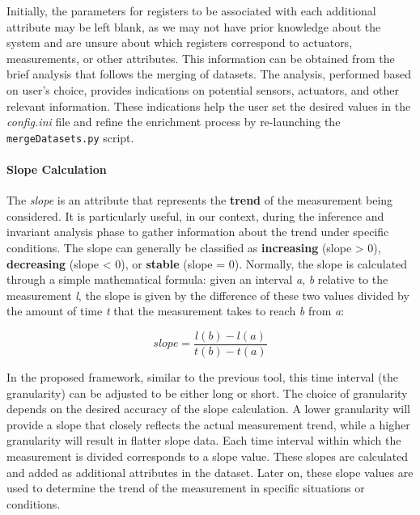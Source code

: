 Initially, the parameters for registers to be associated with each additional attribute may be left blank, as we may not have prior knowledge about the system and are unsure about which registers correspond to actuators, measurements, or other attributes. This information can be obtained from the brief analysis that follows the merging of datasets. The analysis, performed based on user's choice, provides indications on potential sensors, actuators, and other relevant information. These indications help the user set the desired values in the \textit{config.ini} file and refine the enrichment process by re-launching the \texttt{mergeDatasets.py} script.

\paragraph{Slope Calculation}
The \textit{slope} is an attribute that represents the \textbf{trend} of the measurement being considered. It is particularly useful, in our context, during the inference and invariant analysis phase to gather information about the trend under specific conditions. The slope can generally be classified as \textbf{increasing} (slope > 0), \textbf{decreasing} (slope < 0), or \textbf{stable} (slope = 0).\newline
Normally, the slope is calculated through a simple mathematical formula: given an interval \textit{a}, \textit{b} relative to the measurement \textit{l}, the slope is given by the difference of these two values divided by the amount of time \textit{t} that the measurement takes to reach \textit{b} from \textit{a}:

\[slope = \frac{l(b) -l(a)}{t(b) - t(a)}\]

In the proposed framework, similar to the previous tool, this time interval (the granularity) can be adjusted to be either long or short. The choice of granularity depends on the desired accuracy of the slope calculation. A lower granularity will provide a slope that closely reflects the actual measurement trend, while a higher granularity will result in flatter slope data. Each time interval within which the measurement is divided corresponds to a slope value. These slopes are calculated and added as additional attributes in the dataset. Later on, these slope values are used to determine the trend of the measurement in specific situations or conditions.

